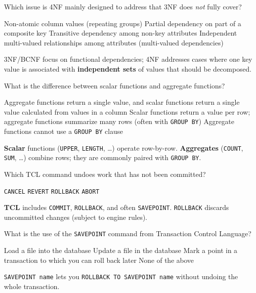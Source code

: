 \question[4]
Which issue is 4NF mainly designed to address that 3NF does \emph{not} fully cover?
\begin{choices}
  \choice Non-atomic column values (repeating groups)
  \choice Partial dependency on part of a composite key
  \choice Transitive dependency among non-key attributes
  \CorrectChoice Independent multi-valued relationships among attributes (multi-valued dependencies)
\end{choices}
\begin{solution}
  3NF/BCNF focus on functional dependencies; 4NF addresses cases where one key value is associated with \textbf{independent sets} of values that should be decomposed.
\end{solution}

\newpage


\question[4]
What is the difference between scalar functions and aggregate functions?
\begin{choices}
  \choice Aggregate functions return a single value, and scalar functions return a single value calculated from values in a column
  \CorrectChoice Scalar functions return a value per row; aggregate functions summarize many rows (often with \texttt{GROUP BY})
  \choice Aggregate functions cannot use a \texttt{GROUP BY} clause
\end{choices}
\begin{solution}
  \textbf{Scalar} functions (\texttt{UPPER}, \texttt{LENGTH}, \ldots) operate row-by-row. \textbf{Aggregates} (\texttt{COUNT}, \texttt{SUM}, \ldots) combine rows; they are commonly paired with \texttt{GROUP BY}.
\end{solution}

\question[4]
Which TCL command undoes work that has not been committed?
\begin{choices}
  \choice \texttt{CANCEL}
  \choice \texttt{REVERT}
  \CorrectChoice \texttt{ROLLBACK}
  \choice \texttt{ABORT}
\end{choices}
\begin{solution}
  \textbf{TCL} includes \texttt{COMMIT}, \texttt{ROLLBACK}, and often \texttt{SAVEPOINT}. \texttt{ROLLBACK} discards uncommitted changes (subject to engine rules).
\end{solution}

\question[4]
What is the use of the \texttt{SAVEPOINT} command from Transaction Control Language?
\begin{choices}
  \choice Load a file into the database
  \choice Update a file in the database
  \CorrectChoice Mark a point in a transaction to which you can roll back later
  \choice None of the above
\end{choices}
\begin{solution}
  \texttt{SAVEPOINT name} lets you \texttt{ROLLBACK TO SAVEPOINT name} without undoing the whole transaction.
\end{solution}

